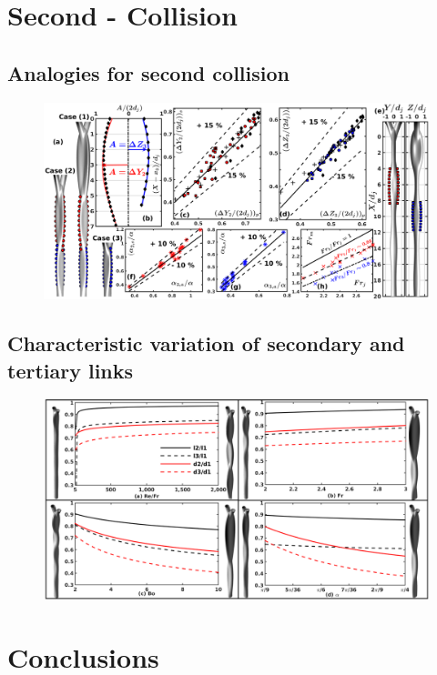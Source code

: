 \documentclass[%
aip,
sd,%
amsmath,amssymb,
preprint,%
author-year,%
]{revtex4-1}
\begin{document}
\section{Second - Collision}
\subsection{Analogies for second collision}
\begin{figure}
	\centering
	\includegraphics[width=\linewidth]{secondCollision}
	\caption{}
	\label{Figure::secondCollision}
\end{figure}
\subsection{Characteristic variation of secondary and tertiary links}
\begin{figure}
	\centering
	\includegraphics[width=\linewidth]{lil1did1}
	\caption{}
	\label{Figure::lil1}
\end{figure}
\section{Conclusions}
\cleardoublepage

\end{document}
